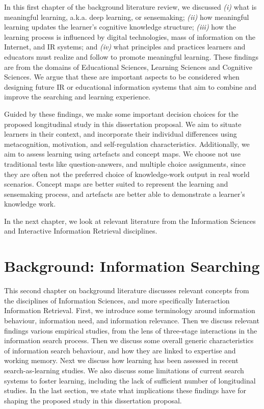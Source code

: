 \documentclass[a4paper, nobind]{templates/ociamthesis}
\begin{document}
In this first chapter of the background literature review, we discussed
\emph{(i)} what is meaningful learning, a.k.a. deep learning, or sensemaking;
\emph{(ii)} how meaningful learning updates the learner's cognitive knowledge
structure; \emph{(iii)} how the learning process is influenced by digital
technologies, mass of information on the Internet, and IR systems; and
\emph{(iv)} what principles and practices learners and educators must realize
and follow to promote meaningful learning. These findings are from the
domains of Educational Sciences, Learning Sciences and Cognitive
Sciences. We argue that these are important aspects to be considered
when designing future IR or educational information systems that aim to
combine and improve the searching and learning experience.

Guided by these findings, we make some important decision choices for
the proposed longitudinal study in this dissertation proposal. We aim to
situate learners in their context, and incorporate their individual
differences using metacognition, motivation, and self-regulation
characteristics. Additionally, we aim to assess learning using artefacts
and concept maps. We choose not use traditional tests like
question-answers, and multiple choice assignments, since they are often
not the preferred choice of knowledge-work output in real world
scenarios. Concept maps are better suited to represent the learning and
sensemaking process, and artefacts are better able to demonstrate a
learner's knowledge work.

In the next chapter, we look at relevant literature from the Information
Sciences and Interactive Information Retrieval disciplines.

\hypertarget{ch:bg_search}{%
\chapter{Background: Information Searching}\label{ch:bg_search}}

This second chapter on background literature discusses relevant concepts
from the disciplines of Information Sciences, and more specifically
Interaction Information Retrieval. First, we introduce some terminology
around information behaviour, information need, and information
relevance. Then we discuss relevant findings various empirical studies,
from the lens of three-stage interactions in the information search
process. Then we discuss some overall generic characteristics of
information search behaviour, and how they are linked to expertise and
working memory. Next we discuss how learning has been assessed in recent
search-as-learning studies. We also discuss some limitations of current
search systems to foster learning, including the lack of sufficient
number of longitudinal studies. In the last section, we state what
implications these findings have for shaping the proposed study in this
dissertation proposal.
\end{document}
